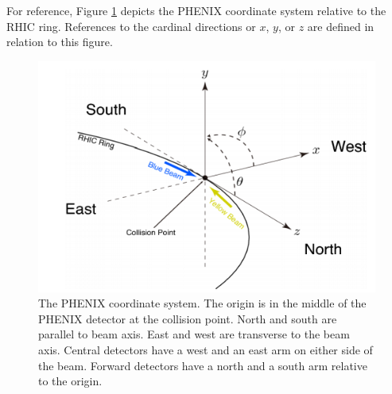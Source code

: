 For reference, Figure \ref{fig:ch3_coord_sys} depicts the PHENIX coordinate system relative to the RHIC ring. References to the cardinal directions or $x$, $y$, or $z$ are defined in relation to this figure.
\begin{figure}[!h]
\begin{center}
\includegraphics[width=0.55\linewidth]{figs/phenix_coord.png}
\caption{The PHENIX coordinate system. The origin is in the middle of the PHENIX detector at the collision point. North and south are parallel to beam axis. East and west are transverse to the beam axis. Central detectors have a west and an east arm on either side of the beam. Forward detectors have a north and a south arm relative to the origin.}
\label{fig:ch3_coord_sys}
\end{center}
\end{figure}

